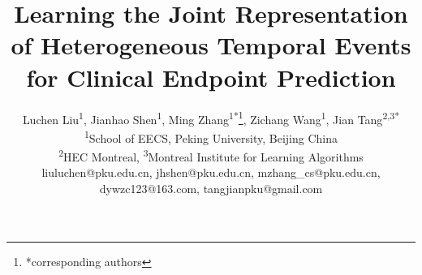 \documentclass[letterpaper]{article} %
\begin{document}
 \renewcommand\footnotemark{}
\title{Learning the Joint Representation of Heterogeneous Temporal Events 
\\for Clinical Endpoint Prediction}
\author{Luchen Liu\textsuperscript{1}, Jianhao Shen\textsuperscript{1}, Ming Zhang\textsuperscript{1*}\thanks{*corresponding authors}, Zichang Wang\textsuperscript{1}, Jian Tang\textsuperscript{2,3*} \\
\textsuperscript{1}School of EECS, Peking University, Beijing China \\
\textsuperscript{2}HEC Montreal, \textsuperscript{3}Montreal Institute for Learning Algorithms \\
liuluchen@pku.edu.cn,
jhshen@pku.edu.cn,
mzhang\_cs@pku.edu.cn,
dywzc123@163.com,
tangjianpku@gmail.com
}
\maketitle
\end{document}
